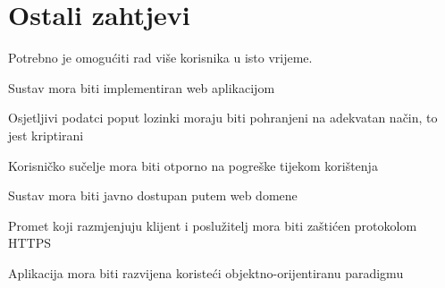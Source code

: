 %				
				\eject
	
		\section{Ostali zahtjevi}
			\begin{packed_item}
				\item Potrebno je omogućiti rad više korisnika u isto vrijeme.
				\item Sustav mora biti implementiran web aplikacijom
				\item Osjetljivi podatci poput lozinki moraju biti pohranjeni na adekvatan način, to jest kriptirani
				\item Korisničko sučelje mora biti otporno na pogreške tijekom korištenja
				\item Sustav mora biti javno dostupan putem web domene 
				\item Promet koji razmjenjuju klijent i poslužitelj mora biti zaštićen protokolom HTTPS
				\item Aplikacija mora biti razvijena koristeći objektno-orijentiranu paradigmu
			\end{packed_item}
%		 
			 
			 
			 
	